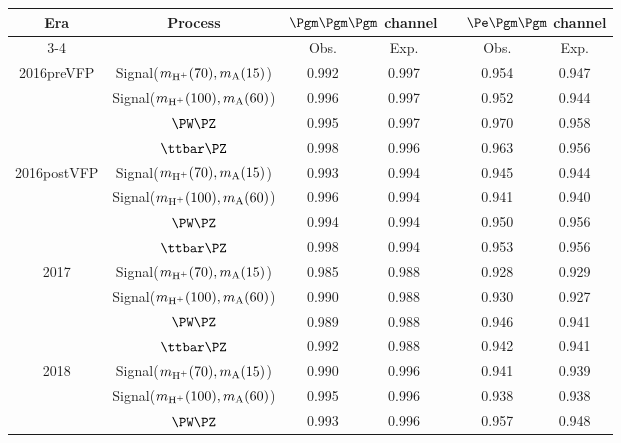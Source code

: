 \begin{table}[htbp]
  \centering
  \begin{tabular}{ccccccc}
    \hline
    \multirow{2}{*}{Era} & \multirow{2}{*}{Process} & \multicolumn{2}{c}{$\Pgm\Pgm\Pgm$ channel} & & \multicolumn{2}{c}{$\Pe\Pgm\Pgm$ channel} \\
    \cline{3-4} \cline{6-7}
    & & Obs. & Exp. & & Obs. & Exp. \\
    \hline
    \multirow{4}{*}{2016preVFP}  & Signal($m_{\text{H}^+}(70), m_{\text{A}}(15)$)   & 0.992 & 0.997 & & 0.954 & 0.947 \\
                                 & Signal($m_{\text{H}^+}(100), m_{\text{A}}(60)$)  & 0.996 & 0.997 & & 0.952 & 0.944 \\
                                 & $\PW\PZ$                      & 0.995 & 0.997 & & 0.970 & 0.958 \\
                                 & $\ttbar\PZ$                   & 0.998 & 0.996 & & 0.963 & 0.956 \\
    \hline
    \multirow{4}{*}{2016postVFP} & Signal($m_{\text{H}^+}(70), m_{\text{A}}(15)$)   & 0.993 & 0.994 & & 0.945 & 0.944 \\
                                 & Signal($m_{\text{H}^+}(100), m_{\text{A}}(60)$)  & 0.996 & 0.994 & & 0.941 & 0.940 \\
                                 & $\PW\PZ$                      & 0.994 & 0.994 & & 0.950 & 0.956 \\
                                 & $\ttbar\PZ$                   & 0.998 & 0.994 & & 0.953 & 0.956 \\
    \hline
    \multirow{4}{*}{2017}        & Signal($m_{\text{H}^+}(70), m_{\text{A}}(15)$)   & 0.985 & 0.988 & & 0.928 & 0.929 \\
                                 & Signal($m_{\text{H}^+}(100), m_{\text{A}}(60)$)  & 0.990 & 0.988 & & 0.930 & 0.927 \\
                                 & $\PW\PZ$                      & 0.989 & 0.988 & & 0.946 & 0.941 \\
                                 & $\ttbar\PZ$                   & 0.992 & 0.988 & & 0.942 & 0.941 \\
    \hline
    \multirow{4}{*}{2018}        & Signal($m_{\text{H}^+}(70), m_{\text{A}}(15)$)   & 0.990 & 0.996 & & 0.941 & 0.939 \\
                                 & Signal($m_{\text{H}^+}(100), m_{\text{A}}(60)$)  & 0.995 & 0.996 & & 0.938 & 0.938 \\
                                 & $\PW\PZ$                      & 0.993 & 0.996 & & 0.957 & 0.948 \\

\end{tabular}
\end{table}
